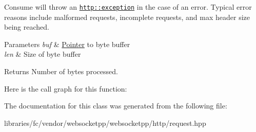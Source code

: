 Consume will throw an \href{http::exception}{\tt http\+::exception} in the case of an error. Typical error reasons include malformed requests, incomplete requests, and max header size being reached.


\begin{DoxyParams}{Parameters}
{\em buf} & \mbox{\hyperlink{struct_pointer}{Pointer}} to byte buffer \\
\hline
{\em len} & Size of byte buffer \\
\hline
\end{DoxyParams}
\begin{DoxyReturn}{Returns}
Number of bytes processed. 
\end{DoxyReturn}
Here is the call graph for this function\+:


The documentation for this class was generated from the following file\+:\begin{DoxyCompactItemize}
\item 
libraries/fc/vendor/websocketpp/websocketpp/http/request.\+hpp\end{DoxyCompactItemize}
